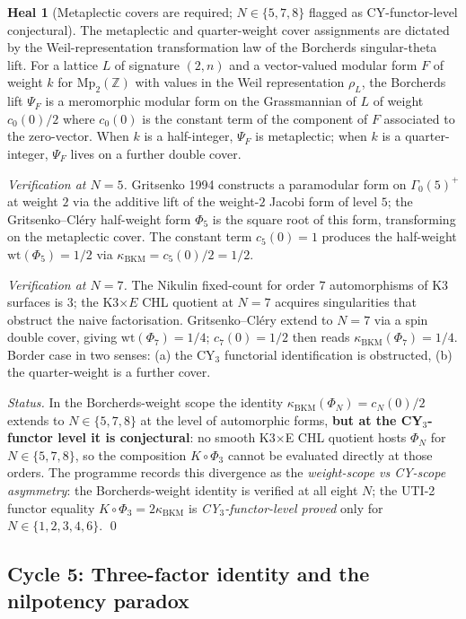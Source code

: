 \documentclass[11pt]{article}
\theoremstyle{definition}
\newtheorem{heal}[theorem]{Heal}
\newcommand{\kBKM}{\kappa_{\mathrm{BKM}}}
\begin{document}
\begin{heal}[Metaplectic covers are required; $N \in \{5, 7, 8\}$ flagged as CY-functor-level conjectural]
The metaplectic and quarter-weight cover assignments are dictated by
the Weil-representation transformation law of the Borcherds
singular-theta lift. For a lattice $L$ of signature $(2, n)$ and a
vector-valued modular form $F$ of weight $k$ for $\mathrm{Mp}_2(\mathbb{Z})$
with values in the Weil representation $\rho_L$, the Borcherds lift
$\Psi_F$ is a meromorphic modular form on the Grassmannian of $L$
of weight $c_0(0)/2$ where $c_0(0)$ is the constant term of the
component of $F$ associated to the zero-vector. When $k$ is a half-integer,
$\Psi_F$ is metaplectic; when $k$ is a quarter-integer, $\Psi_F$ lives
on a further double cover.

\emph{Verification at $N = 5$.} Gritsenko 1994 constructs a paramodular
form on $\Gamma_0(5)^+$ at weight $2$ via the additive lift of the
weight-$2$ Jacobi form of level $5$; the Gritsenko--Cl\'ery half-weight
form $\Phi_5$ is the square root of this form, transforming on the
metaplectic cover. The constant term $c_5(0) = 1$ produces the
half-weight $\mathrm{wt}(\Phi_5) = 1/2$ via $\kBKM = c_5(0)/2 = 1/2$.

\emph{Verification at $N = 7$.} The Nikulin fixed-count for order $7$
automorphisms of K3 surfaces is $3$; the K3$\times E$ CHL quotient at
$N = 7$ acquires singularities that obstruct the naive factorisation.
Gritsenko--Cl\'ery extend to $N = 7$ via a spin double cover, giving
$\mathrm{wt}(\Phi_7) = 1/4$; $c_7(0) = 1/2$ then reads
$\kBKM(\Phi_7) = 1/4$. Border case in two senses: (a) the CY$_3$
functorial identification is obstructed, (b) the quarter-weight is a
further cover.

\emph{Status.} In the Borcherds-weight scope the identity
$\kBKM(\Phi_N) = c_N(0)/2$ extends to $N \in \{5, 7, 8\}$ at the level
of automorphic forms, \textbf{but at the CY$_3$-functor level it is
conjectural}: no smooth K3$\times$E CHL quotient hosts $\Phi_N$ for
$N \in \{5, 7, 8\}$, so the composition $K \circ \Phi_3$ cannot be
evaluated directly at those orders. The programme records this
divergence as the \emph{weight-scope vs CY-scope asymmetry}:
the Borcherds-weight identity is verified at all eight $N$;
the UTI-2 functor equality $K \circ \Phi_3 = 2 \kBKM$ is
\emph{CY$_3$-functor-level proved} only for $N \in \{1, 2, 3, 4, 6\}$.
\qed
\end{heal}

\subsection{Cycle 5: Three-factor identity and the nilpotency paradox}
\end{document}

